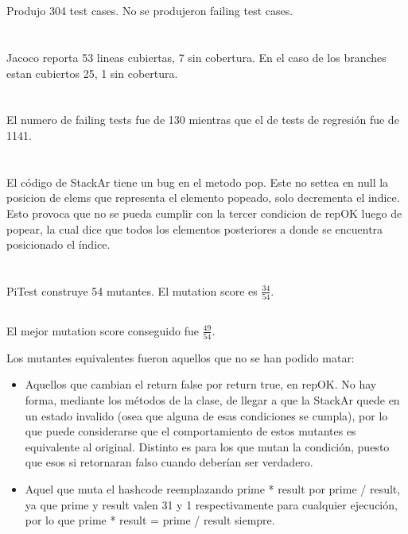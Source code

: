 \section{}
Produjo 304 test cases. No se produjeron failing test cases.

\section{}
Jacoco reporta 53 lineas cubiertas, 7 sin cobertura. En el caso de los branches estan cubiertos 25, 1 sin cobertura.

\section{}
El numero de failing tests fue de 130 mientras que el de tests de regresión fue de 1141.

\section{}
El código de StackAr tiene un bug en el metodo pop. Este no settea en null la posicion de elems que representa el elemento popeado, solo decrementa el indice. Esto provoca que no se pueda cumplir con la tercer condicion de repOK luego de popear, la cual dice que todos los elementos posteriores a donde se encuentra posicionado el índice.

\section{}
\subsection{}
PiTest construye 54 mutantes. El mutation score es $\frac{34}{54}$.

\subsection{}
El mejor mutation score conseguido fue $\frac{49}{54}$.

Los mutantes equivalentes fueron aquellos que no se han podido matar:

\begin{itemize}
\item Aquellos que cambian el return false por return true, en repOK. No hay forma, mediante los métodos de la clase, de llegar a que la StackAr quede en un estado invalido (osea que alguna de esas condiciones se cumpla), por lo que puede considerarse que el comportamiento de estos mutantes es equivalente al original. Distinto es para los que mutan la condición, puesto que esos si retornaran falso cuando deberían ser verdadero. \\

\item Aquel que muta el hashcode reemplazando prime * result por prime / result, ya que prime y result valen 31 y 1 respectivamente para cualquier ejecución, por lo que prime * result = prime / result siempre. \\
\end{itemize}
